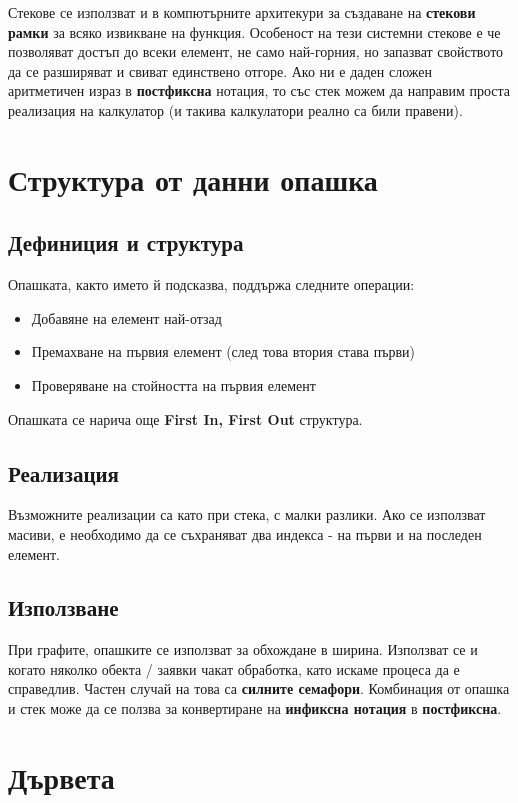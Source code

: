 \documentclass[fleqn,12pt]{article}
\begin{document}
Стекове се използват и в компютърните архитекури за създаване на \textbf{стекови рамки} за всяко извикване на функция. Особеност на 
тези системни стекове е че позволяват достъп до всеки елемент, не само най-горния, но запазват свойството да се разширяват и свиват
единствено отгоре. Ако ни е даден сложен аритметичен израз в \textbf{постфиксна} нотация, то със стек можем да направим проста реализация на калкулатор
(и такива калкулатори реално са били правени).

\section{Структура от данни опашка}
\subsection{Дефиниция и структура}
Опашката, както името й подсказва, поддържа следните операции:
\begin{itemize}
    \item Добавяне на елемент най-отзад
    \item Премахване на първия елемент (след това втория става първи)
    \item Проверяване на стойността на първия елемент
\end{itemize}

Опашката се нарича още \textbf{First In, First Out} структура.

\subsection{Реализация}
Възможните реализации са като при стека, с малки разлики. Ако се използват масиви, е необходимо да се съхраняват два индекса - на първи и на последен елемент.

\subsection{Използване}
При графите, опашките се използват за обхождане в ширина. Използват се и когато няколко обекта / заявки чакат обработка, като искаме процеса да е справедлив.
Частен случай на това са \textbf{силните семафори}. Комбинация от опашка и стек може да се ползва за конвертиране на \textbf{инфиксна нотация} в \textbf{постфиксна}.

\section{Дървета}
\end{document}
